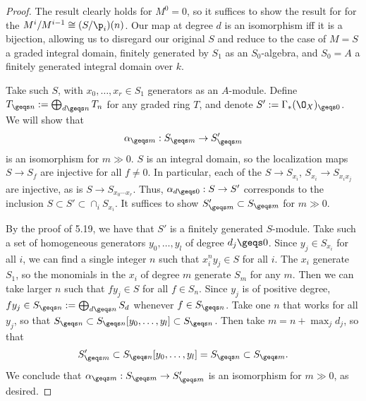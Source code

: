 \documentclass[12pt]{amsart}
\begin{document}
\begin{proof}
  The result clearly holds for $M^0=0$, so it suffices to show the result for for the $M^i/M^{i-1}\cong (S/\p_i)(n)$.
  Our map at degree $d$ is an isomorphism iff it is a bijection, allowing us to disregard our original $S$ and reduce to the case of $M=S$ a graded integral domain, finitely generated by $S_1$ as an $S_0$-algebra, and $S_0=A$ a finitely generated integral domain over $k$.

  Take such $S$, with $x_0,\ldots, x_r\in S_1$ generators as an $A$-module.
  Define $T_{\geqs n}:=\bigoplus_{d\geqs n}T_n$ for any graded ring $T$, and denote $S':=\Gamma_*(\O_X)_{\geqs 0}$.
  We will show that 
  \[
    \alpha_{\geqs m}:S_{\geqs m}\to S'_{\geqs m}
  \]
  is an isomorphism for $m\gg0$.
  $S$ is an integral domain, so the localization maps $S\to S_f$ are injective for all $f\neq 0$.
  In particular, each of the $S\to S_{x_i}$, $S_{x_i}\to S_{x_ix_j}$ are injective, as is $S\to S_{x_0\cdots x_r}$.
  Thus, $\alpha_{d\geqs 0}:S\to S'$ corresponds to the inclusion $S\subset S'\subset \cap_iS_{x_i}$.
  It suffices to show $S'_{\geqs m}\subset S_{\geqs m}$ for $m\gg0$.

  By the proof of 5.19, we have that $S'$ is a finitely generated $S$-module.
  Take such a set of homogeneous generators $y_0,\ldots, y_l$ of degree $d_j\geqs 0$.
  Since $y_j\in S_{x_i}$ for all $i$, we can find a single integer $n$ such that $x_i^ny_j\in S$ for all $i$.
  The $x_i$ generate $S_1$, so the monomials in the $x_i$ of degree $m$ generate $S_m$ for any $m$.
  Then we can take larger $n$ such that $fy_j\in S$ for all $f\in S_n$.
  Since $y_j$ is of positive degree, $fy_j\in S_{\geqs n}:=\bigoplus_{d\geqs n}S_d$ whenever $f\in S_{\geqs n}$.
  Take one $n$ that works for all $y_j$, so that $S_{\geqs n}\subset S_{\geqs n}[y_0,\ldots, y_l]\subset S_{\geqs n}$.
  Then take $m=n+\max_j d_j$, so that
  \begin{align*}
    S'_{\geqs m} \subset S_{\geqs n}[y_0,\ldots,y_l]=S_{\geqs n}\subset S_{\geqs m}.
  \end{align*}
  We conclude that $\alpha_{\geqs m}:S_{\geqs m}\to S'_{\geqs m}$ is an isomorphism for $m\gg0$, as desired.


\end{proof}
\end{document}
